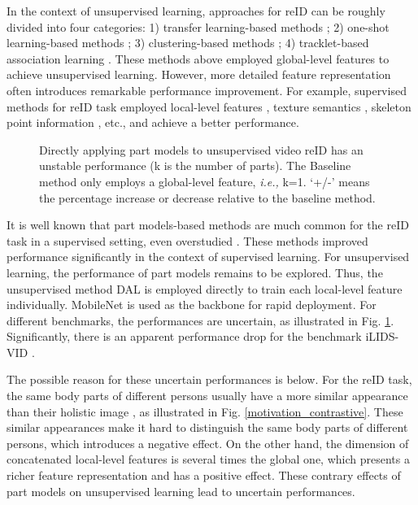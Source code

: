 \documentclass{cta-author}
\begin{document}
	In the context of unsupervised learning, approaches for reID can be roughly divided into four categories: 1) transfer learning-based methods \cite{RN495} \cite{RN372} \cite{RN353}; 2) one-shot learning-based methods \cite{RN390} \cite{RN107} \cite{RN95}; 3) clustering-based methods \cite{RN360} \cite{RN247} \cite{RN118}; 4) tracklet-based association learning \cite{RN97} \cite{RN87} \cite{RN369} \cite{RN389}. These methods above employed global-level features to achieve unsupervised learning. However, more detailed feature representation often introduces remarkable performance improvement. For example, supervised methods for reID task employed local-level features \cite{RN191} \cite{RN229}, texture semantics \cite{RN452} \cite{RN477}, skeleton point information \cite{RN472} \cite{RN108} \cite{RN291}, etc., and achieve a better performance. 
		
	\begin{figure}[!h]
		\caption{Directly applying part models to unsupervised video reID has an unstable performance (k is the number of parts). The Baseline method only employs a global-level feature, \textit{i.e.,} k=1. `+/-' means the percentage increase or decrease relative to the baseline method. } \label{motivation_new}
	\end{figure}
	
	It is well known that part models-based methods are much common for the reID task in a supervised setting, even overstudied \cite{RN191} \cite{RN456} \cite{RN231} \cite{RN472} \cite{RN448} \cite{RN229}. These methods improved performance significantly in the context of supervised learning. For unsupervised learning, the performance of part models remains to be explored. Thus, the unsupervised method DAL \cite{RN187} is employed directly to train each local-level feature individually. MobileNet \cite{RN228} is used as the backbone for rapid deployment. For different benchmarks, the performances are uncertain, as illustrated in Fig. \ref{motivation_new}. Significantly, there is an apparent performance drop for the benchmark iLIDS-VID \cite{RN385}.
	
	The possible reason for these uncertain performances is below. For the reID task, the same body parts of different persons usually have a more similar appearance than their holistic image \cite{RN98}, as illustrated in Fig. \ref{motivation_contrastive}. These similar appearances make it hard to distinguish the same body parts of different persons, which introduces a negative effect. On the other hand, the dimension of concatenated local-level features is several times the global one, which presents a richer feature representation and has a positive effect. These contrary effects of part models on unsupervised learning lead to uncertain performances.
	
\end{document}

